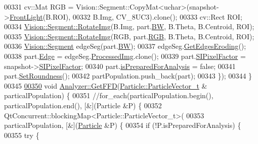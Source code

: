 \begin{DoxyCode}
00331     cv::Mat RGB = Vision::Segment::CopyMat<uchar>(snapshot->\hyperlink{struct_soil_analyzer_1_1_analyzer_1_1_image__t_aea2974c543b090703237f17d0c192699}{FrontLight}(B.ROI),
00332                                                   B.Img, CV\_8UC3).clone();
00333     cv::Rect ROI;
00334     \hyperlink{class_vision_1_1_image_processing_a2cbae1b5d9542edab2e59da8e3e23d2a}{Vision::Segment::RotateImg}(B.Img, part.\hyperlink{class_soil_analyzer_1_1_particle_a885a9f3ca828244a72c5866fff7d2e89}{BW}, B.Theta, B.Centroid, ROI);
00335     \hyperlink{class_vision_1_1_image_processing_a2cbae1b5d9542edab2e59da8e3e23d2a}{Vision::Segment::RotateImg}(RGB, part.\hyperlink{class_soil_analyzer_1_1_particle_a5c3457748fc4f3309bffdcb635c70458}{RGB}, B.Theta, B.Centroid, ROI);
00336     \hyperlink{class_vision_1_1_segment}{Vision::Segment} edgeSeg(part.\hyperlink{class_soil_analyzer_1_1_particle_a885a9f3ca828244a72c5866fff7d2e89}{BW});
00337     edgeSeg.\hyperlink{class_vision_1_1_segment_af4fe7471c44ded04653f8e3f74162c86}{GetEdgesEroding}();
00338     part.\hyperlink{class_soil_analyzer_1_1_particle_a0933445f172fb27b7bade9740938a2a5}{Edge} = edgeSeg.\hyperlink{class_vision_1_1_image_processing_aa7d65742882cd1b2a1e4e9cb68809211}{ProcessedImg}.clone();
00339     part.\hyperlink{class_soil_analyzer_1_1_particle_a5156110e9617d656a7b878a8a0fbe024}{SIPixelFactor} = snapshot->\hyperlink{struct_soil_analyzer_1_1_analyzer_1_1_image__t_a7b7c4dfb4d2ed5da141feed7cfc9cfe9}{SIPixelFactor};
00340     part.\hyperlink{class_soil_analyzer_1_1_particle_aead45a461f496be6fa4a200fb0d8a150}{isPreparedForAnalysis} = \textcolor{keyword}{false};
00341     part.\hyperlink{class_soil_analyzer_1_1_particle_a52c104046f8cc25940ae26a84c91a62c}{SetRoundness}();
00342     partPopulation.push\_back(part);
00343   \});
00344 \}
00345 
\hypertarget{analyzer_8cpp_source_l00350}{}\hyperlink{class_soil_analyzer_1_1_analyzer_aeed5e3b158ff37d5fecb2816e12c3c31}{00350} \textcolor{keywordtype}{void} \hyperlink{class_soil_analyzer_1_1_analyzer_aeed5e3b158ff37d5fecb2816e12c3c31}{Analyzer::GetFFD}(\hyperlink{class_soil_analyzer_1_1_particle_a4e43dab999d36d5a5f809bb4be5ff3a7}{Particle::ParticleVector\_t} &
      particalPopulation) \{
00351   \textcolor{comment}{//for\_each(particalPopulation.begin(), particalPopulation.end(),  [&](Particle &P) \{}
00352   QtConcurrent::blockingMap<Particle::ParticleVector\_t>(
00353       particalPopulation, [&](\hyperlink{class_soil_analyzer_1_1_particle}{Particle} &P) \{
00354         \textcolor{keywordflow}{if} (!P.isPreparedForAnalysis) \{
00355           \textcolor{keywordflow}{try} \{

\end{DoxyCode}
